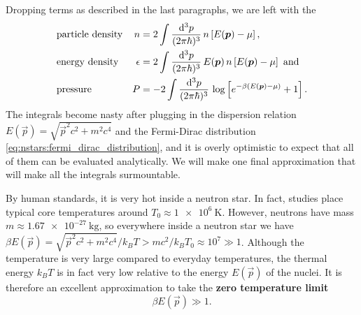 Dropping terms as described in the last paragraphs, we are left with the
\begin{equation}
\begin{aligned}
	& \text{particle density} & n        &=  2 \int \frac{\mathop{}\!\mathrm{d}^3 p}{(2 \pi \hbar)^3} \, n \left[ E({\bm{p}})-\mu \right] , \\
	& \text{energy density}   & \epsilon &=  2 \int \frac{\mathop{}\!\mathrm{d}^3 p}{(2 \pi \hbar)^3} \, E({\bm{p}}) \, n \left[ E({\bm{p}})-\mu \right] \text{ and} \\
	& \text{pressure}         & P        &= -2 \int \frac{\mathop{}\!\mathrm{d}^3 p}{(2 \pi \hbar)^3} \, \log \left[ e^{-\beta(E({\bm{p}})-\mu)} + 1 \right] . \\
\end{aligned}
\label{eq:nstars:dropped_infinities}
\end{equation}
The integrals become nasty after plugging in the dispersion relation $E(\vec{p}) = \sqrt{\vec{p}^2 c^2 + m^2 c^4}$  and the Fermi-Dirac distribution \eqref{eq:nstars:fermi_dirac_distribution}, and it is overly optimistic to expect that all of them can be evaluated analytically.
We will make one final approximation that will make all the integrals surmountable.

By human standards, it is very hot inside a neutron star.
In fact, studies place typical core temperatures around $T_0 \approx \SI{1e6}{\kelvin}$.
However, neutrons have mass $m \approx \SI{1.67e-27}{\kilogram}$, so everywhere inside a neutron star we have $\beta E(\vec{p}) = \sqrt{\vec{p}^2 c^2 + m^2 c^4} / k_B T > m c^2 / k_B T_0 \approx 10^7 \gg 1$.
Although the temperature is very large compared to everyday temperatures, the thermal energy $k_B T$ is in fact very low relative to the energy $E(\vec{p})$ of the nuclei.
It is therefore an excellent approximation to take the \textbf{zero temperature limit}
\begin{equation}
	\beta E(\vec{p}) \gg 1 .
\end{equation}


